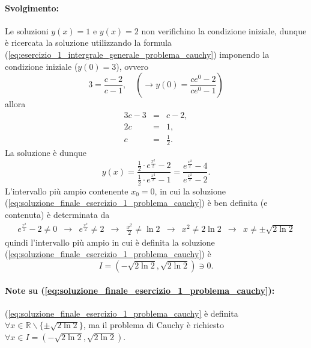 \begin{example}
    \paragraph{Svolgimento:} Le soluzioni $y(x)=1$ e $y(x)=2$ non verifichino la condizione iniziale, dunque è ricercata la soluzione utilizzando la formula (\ref{eq:esercizio_1_intergrale_generale_problema_cauchy}) imponendo la condizione iniziale ($y(0)=3$), ovvero
    \begin{equation*}
        3=\frac{c-2}{c-1},\quad \left(\rightarrow y(0)=\frac{ce^0-2}{ce^0-1}\right)
    \end{equation*}
    allora
    \begin{equation*}
        \begin{matrix}
            3c - 3 &=& c-2,\\
            2c &=& 1,\\
            c &=&\frac{1}{2}.
        \end{matrix}
    \end{equation*}
    La soluzione è dunque
    \begin{equation}\label{eq:soluzione_finale_esercizio_1_problema_cauchy}
        y(x)=\frac{\frac{1}{2}\cdot e^{\frac{x^2}{2}}-2}{\frac{1}{2}\cdot e^{\frac{x^2}{2}}-1} = \frac{e^{\frac{x^2}{2}}-4}{e^{\frac{x^2}{2}}-2}.
    \end{equation}
    \footnotemark L'intervallo più ampio contenente $x_0=0$, in cui la soluzione (\ref{eq:soluzione_finale_esercizio_1_problema_cauchy}) è ben definita (e contenuta) è determinata da
    \begin{equation*}
        \begin{matrix}
            e^{\frac{x^2}{2}}-2 \neq 0 &\rightarrow& e^{\frac{x^2}{2}}\neq 2 &\rightarrow& \frac{x^2}{2}\neq\ln 2 &\rightarrow& x^2\neq 2\ln2 &\rightarrow& x\neq\pm \sqrt{2\ln2}
        \end{matrix}
    \end{equation*}
    quindi l'intervallo più ampio in cui è definita la soluzione (\ref{eq:soluzione_finale_esercizio_1_problema_cauchy}) è
    \begin{equation*}
        I=(-\sqrt{2\ln2}, \sqrt{2\ln2})\ni 0.
    \end{equation*}
    
    \paragraph{Note su (\ref{eq:soluzione_finale_esercizio_1_problema_cauchy}):} (\ref{eq:soluzione_finale_esercizio_1_problema_cauchy} è definita $\forall x\in\mathbb{R}\backslash\{\pm\sqrt{2\ln 2}\} $, ma il problema di Cauchy è richiesto $\forall x\in I=(-\sqrt{2\ln2}, \sqrt{2\ln2})$.
    

\end{example}
